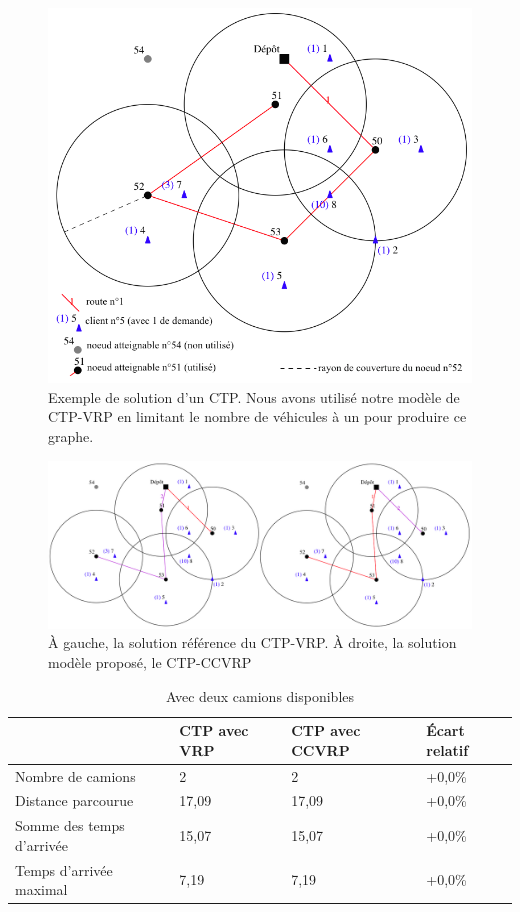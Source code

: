 \documentclass[12pt, a4paper, onecolumn, twoside,french,cleardoublepage=plain,openany]{article}
\begin{document}
\begin{figure}[H] \centering
	\includegraphics[width=0.999\textwidth]{figures/ctp_sans_vrp}
	\caption[]{Exemple de solution d'un CTP. Nous avons utilisé notre modèle de CTP-VRP en limitant le nombre de véhicules à un pour produire ce graphe.} \label{fig_ctp_sans_vrp} 
\end{figure}


\begin{figure}[H] \centering
	\centerline{\includegraphics[width=1.3\textwidth]{figures/deux_camions_combines}}
	\caption[]{À gauche, la solution référence du CTP-VRP. À droite, la solution modèle proposé, le CTP-CCVRP} \label{fig_deux_camions}
\end{figure}

\begin{table}[H] \centering \begin{tabular}{@{}llll@{}} \toprule %
 & CTP avec VRP & CTP avec CCVRP & Écart relatif \\ \midrule
Nombre de camions & 2 & 2 & +0,0\% \\
Distance parcourue & 17,09 & 17,09 & +0,0\% \\
Somme des temps d'arrivée & 15,07 & 15,07 & +0,0\% \\
Temps d'arrivée maximal & 7,19 & 7,19 & +0,0\% \\ \bottomrule
\end{tabular} \caption{Avec deux camions disponibles} \label{deux_camions}
\end{table}
\end{document}
